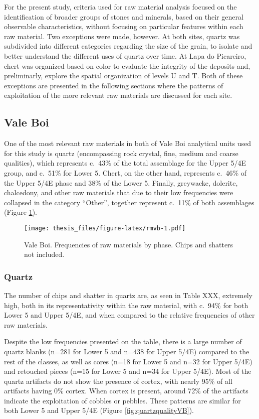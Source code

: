 \documentclass[12pt,twoside]{reedthesis}
\begin{document}
For the present study, criteria used for raw material analysis focused on the identification of broader groups of stones and minerals, based on their general observable characteristics, without focusing on particular features within each raw material. Two exceptions were made, however. At both sites, quartz was subdivided into different categories regarding the size of the grain, to isolate and better understand the different uses of quartz over time. At Lapa do Picareiro, chert was organized based on color to evaluate the integrity of the deposits and, preliminarly, explore the spatial organization of levels U and T. Both of these exceptions are presented in the following sections where the patterns of exploitation of the more relevant raw materials are discussed for each site.

\hypertarget{vale-boi-3}{%
\subsection{Vale Boi}\label{vale-boi-3}}

One of the most relevant raw materials in both of Vale Boi analytical units used for this study is quartz (encompassing rock crystal, fine, medium and coarse qualities), which represents c.~43\% of the total assemblage for the Upper 5/4E group, and c.~51\% for Lower 5. Chert, on the other hand, represents c.~46\% of the Upper 5/4E phase and 38\% of the Lower 5. Finally, greywacke, dolerite, chalcedony, and other raw materials that due to their low frequencies were collapsed in the category ``Other'', together represent c.~11\% of both assemblages (Figure \ref{fig:rmvb}).
\begin{figure}
\centering
\texttt{[image: thesis\_files/figure-latex/rmvb-1.pdf]}
\caption{\label{fig:rmvb}Vale Boi. Frequencies of raw materials by phase. Chips and shatters not included.}
\end{figure}
\hypertarget{quartz}{%
\subsubsection{Quartz}\label{quartz}}

The number of chips and shatter in quartz are, as seen in Table XXX, extremely high, both in its representativity within the raw material, with c.~94\% for both Lower 5 and Upper 5/4E, and when compared to the relative frequencies of other raw materials.

Despite the low frequencies presented on the table, there is a large number of quartz blanks (n=281 for Lower 5 and n=438 for Upper 5/4E) compared to the rest of the classes, as well as cores (n=18 for Lower 5 and n=32 for Upper 5/4E) and retouched pieces (n=15 for Lower 5 and n=34 for Upper 5/4E).
Most of the quartz artifacts do not show the presence of cortex, with nearly 95\% of all artifacts having 0\% cortex. When cortex is present, around 72\% of the artifacts indicate the exploitation of cobbles or pebbles. These patterns are similar for both Lower 5 and Upper 5/4E (Figure \ref{fig:quartzqualityVB}).
\end{document}
